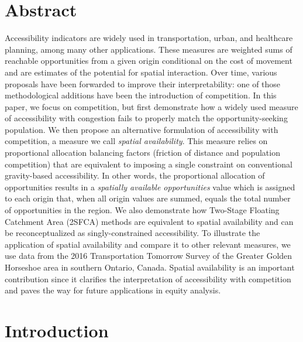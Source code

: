 \documentclass[10pt,letterpaper]{article}
\begin{document}
\section*{Abstract}
Accessibility indicators are widely used in transportation, urban, and
healthcare planning, among many other applications. These measures are
weighted sums of reachable opportunities from a given origin conditional
on the cost of movement and are estimates of the potential for spatial
interaction. Over time, various proposals have been forwarded to improve
their interpretability: one of those methodological additions have been
the introduction of competition. In this paper, we focus on competition,
but first demonstrate how a widely used measure of accessibility with
congestion fails to properly match the opportunity-seeking population.
We then propose an alternative formulation of accessibility with
competition, a measure we call \emph{spatial availability}. This measure
relies on proportional allocation balancing factors (friction of
distance and population competition) that are equivalent to imposing a
single constraint on conventional gravity-based accessibility. In other
words, the proportional allocation of opportunities results in a
\emph{spatially available opportunities} value which is assigned to each
origin that, when all origin values are summed, equals the total number
of opportunities in the region. We also demonstrate how Two-Stage
Floating Catchment Area (2SFCA) methods are equivalent to spatial
availability and can be reconceptualized as singly-constrained
accessibility. To illustrate the application of spatial availability and
compare it to other relevant measures, we use data from the 2016
Transportation Tomorrow Survey of the Greater Golden Horseshoe area in
southern Ontario, Canada. Spatial availability is an important
contribution since it clarifies the interpretation of accessibility with
competition and paves the way for future applications in equity
analysis.


\linenumbers

\newpage

\hypertarget{sec:introduction}{%
\section{Introduction}\label{sec:introduction}}
\end{document}
